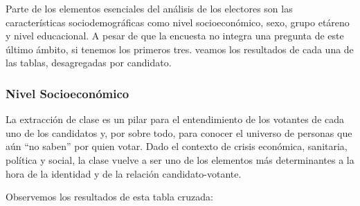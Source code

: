 \documentclass[
]{article}
\begin{document}
Parte de los elementos esenciales del análisis de los electores son las
características sociodemográficas como nivel socioeconómico, sexo, grupo
etáreno y nivel educacional. A pesar de que la encuesta no integra una
pregunta de este último ámbito, si tenemos los primeros tres. veamos los
resultados de cada una de las tablas, desagregadas por candidato.

\hypertarget{nivel-socioeconuxf3mico}{%
\subsubsection{\texorpdfstring{\textbf{Nivel
Socioeconómico}}{Nivel Socioeconómico}}\label{nivel-socioeconuxf3mico}}

La extracción de clase es un pilar para el entendimiento de los votantes
de cada uno de los candidatos y, por sobre todo, para conocer el
universo de personas que aún ``no saben'' por quien votar. Dado el
contexto de crisis económica, sanitaria, política y social, la clase
vuelve a ser uno de los elementos más determinantes a la hora de la
identidad y de la relación candidato-votante.

Observemos los resultados de esta tabla cruzada:
\end{document}
